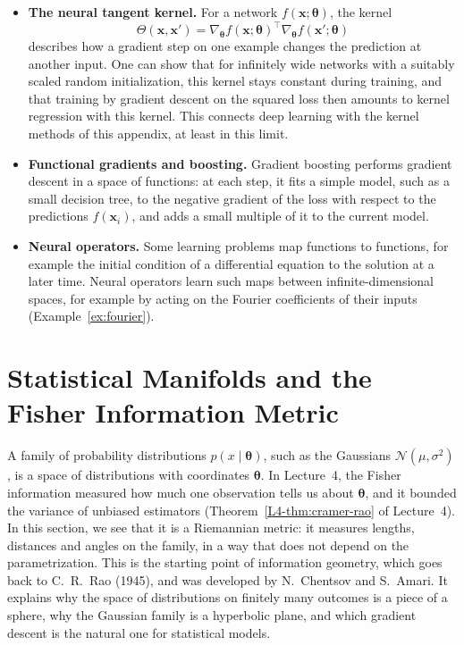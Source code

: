 \documentclass[11pt]{article}
\theoremstyle{definition}
\theoremstyle{plain}
\theoremstyle{remark}
\begin{document}
\begin{itemize}
    \item \textbf{The neural tangent kernel.} For a network $f(\mathbf{x}; \boldsymbol{\theta})$, the kernel
    \[\Theta(\mathbf{x}, \mathbf{x}') = \nabla_{\boldsymbol{\theta}}f(\mathbf{x}; \boldsymbol{\theta})^\top\nabla_{\boldsymbol{\theta}}f(\mathbf{x}'; \boldsymbol{\theta})\]
    describes how a gradient step on one example changes the prediction at another input. One can show that for infinitely wide networks with a suitably scaled random initialization, this kernel stays constant during training, and that training by gradient descent on the squared loss then amounts to kernel regression with this kernel. This connects deep learning with the kernel methods of this appendix, at least in this limit.
    \item \textbf{Functional gradients and boosting.} Gradient boosting performs gradient descent in a space of functions: at each step, it fits a simple model, such as a small decision tree, to the negative gradient of the loss with respect to the predictions $f(\mathbf{x}_i)$, and adds a small multiple of it to the current model.
    \item \textbf{Neural operators.} Some learning problems map functions to functions, for example the initial condition of a differential equation to the solution at a later time. Neural operators learn such maps between infinite-dimensional spaces, for example by acting on the Fourier coefficients of their inputs (Example~\ref{ex:fourier}).
\end{itemize}

\section{Statistical Manifolds and the Fisher Information Metric}\label{sec:fisher}

A family of probability distributions $p(x \mid \boldsymbol{\theta})$, such as the Gaussians $\mathcal{N}(\mu, \sigma^2)$, is a space of distributions with coordinates $\boldsymbol{\theta}$. In Lecture~4, the Fisher information measured how much one observation tells us about $\boldsymbol{\theta}$, and it bounded the variance of unbiased estimators (Theorem~\ref{L4-thm:cramer-rao} of Lecture~4). In this section, we see that it is a Riemannian metric: it measures lengths, distances and angles on the family, in a way that does not depend on the parametrization. This is the starting point of information geometry, which goes back to C.~R.~Rao (1945), and was developed by N.~Chentsov and S.~Amari. It explains why the space of distributions on finitely many outcomes is a piece of a sphere, why the Gaussian family is a hyperbolic plane, and which gradient descent is the natural one for statistical models.
\end{document}
